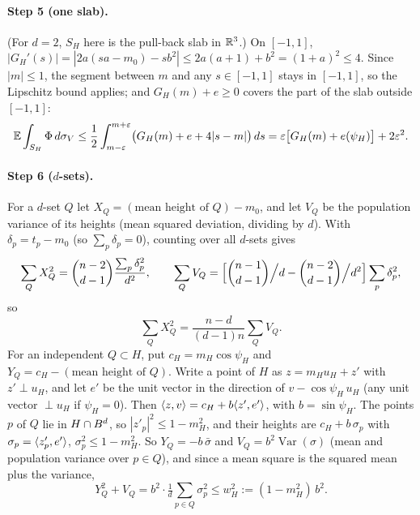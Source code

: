 \paragraph{Step 5 (one slab).} (For $d = 2$, $S_H$ here is the pull-back slab in $\mathbb{R}^3$.) On
$[-1, 1]$,
$|G_H'(s)| = |2a(sa - m_0) - sb^2| \le 2a(a + 1) + b^2 = (1 + a)^2 \le 4$. Since $|m| \le 1$, the
segment between $m$ and any $s \in [-1, 1]$ stays in $[-1, 1]$, so the Lipschitz bound applies; and
$G_H(m) + e \ge 0$ covers the part of the slab outside $[-1, 1]$:
\begin{equation*}
  \mathbb{E} \int_{S_H} \Phi \, d\sigma_V
    \le \frac12 \int_{m-\varepsilon}^{m+\varepsilon} \bigl(G_H(m) + e + 4|s - m|\bigr)\, ds
    = \varepsilon\bigl[G_H(m) + e(\psi_H)\bigr] + 2\varepsilon^2.
\end{equation*}

\paragraph{Step 6 ($d$-sets).} For a $d$-set $Q$ let $X_Q = (\text{mean height of } Q) - m_0$, and
let $V_Q$ be the population variance of its heights (mean squared deviation, dividing by $d$).
With $\delta_p = t_p - m_0$ (so $\sum_p \delta_p = 0$), counting over all $d$-sets gives
\begin{equation*}
  \sum_Q X_Q^2 = \binom{n-2}{d-1} \frac{\sum_p \delta_p^2}{d^2}, \qquad
  \sum_Q V_Q = \Bigl[\binom{n-1}{d-1}\Big/d - \binom{n-2}{d-1}\Big/d^2\Bigr] \sum_p \delta_p^2,
\end{equation*}
so
\begin{equation*}
  \sum_Q X_Q^2 = \frac{n - d}{(d - 1)n} \sum_Q V_Q.
\end{equation*}
For an independent $Q \subset H$, put $c_H = m_H \cos\psi_H$ and
$Y_Q = c_H - (\text{mean height of } Q)$. Write a point of $H$ as $z = m_H u_H + z'$ with
$z' \perp u_H$, and let $e'$ be the unit vector in the direction of $v - \cos\psi_H\, u_H$ (any unit
vector $\perp u_H$ if $\psi_H = 0$). Then $\langle z,v\rangle = c_H + b\langle z',e'\rangle$, with $b = \sin\psi_H$.
The points $p$ of $Q$ lie in $H \cap B^d$, so $|z'_p|^2 \le 1 - m_H^2$, and their heights are
$c_H + b\,\sigma_p$ with $\sigma_p = \langle z'_p,e'\rangle$, $\sigma_p^2 \le 1 - m_H^2$. So $Y_Q = -b\,\bar\sigma$
and $V_Q = b^2 \operatorname{Var}(\sigma)$ (mean and population variance over $p \in Q$), and since a
mean square is the squared mean plus the variance,
\begin{equation*}
  Y_Q^2 + V_Q = b^2 \cdot \tfrac1d \textstyle\sum_{p \in Q} \sigma_p^2 \le w_H^2 := (1 - m_H^2)\, b^2 .
\end{equation*}
